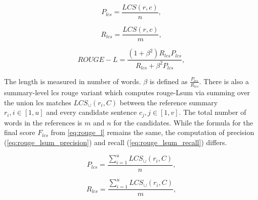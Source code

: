 \begin{equation}
P_{lcs} = \frac{LCS(r,c)}{n},
\label{eq:rouge_l_precision}
\end{equation}

\begin{equation}
R_{lcs} = \frac{LCS(r,c)}{m},
\label{eq:rouge_l_recall}
\end{equation}

\begin{equation}
ROUGE-L = \frac{(1 + \beta^2)R_{lcs}P_{lcs}}{R_{lcs} + \beta^2 P_{lcs}},
\label{eq:rouge_l}
\end{equation}

The length is measured in number of words.
$\beta$ is defined as $\frac{P_{lcs}}{R_{lcs}}$.
There is also a summary-level \ac{lcs} \ac{rouge} variant which computes \ac{rouge}-Lsum via summing over the union \ac{lcs} matches $LCS_\cup(r_i,C)$ between the reference summary $r_i, i \in [1,u]$ and every candidate sentence $c_j, j \in [1,v]$.
The total number of words in the references is $m$ and $n$ for the candidates.
While the formula for the final score $F_{lcs}$ from \autoref{eq:rouge_l} remains the same, the computation of precision (\autoref{eq:rouge_lsum_precision}) and recall (\autoref{eq:rouge_lsum_recall}) differs.

\begin{equation}
P_{lcs} = \frac{\sum_{i=1}^{u}LCS_\cup(r_i,C)}{n},
\label{eq:rouge_lsum_precision}
\end{equation}

\begin{equation}
R_{lcs} = \frac{\sum_{i=1}^{u}LCS_\cup(r_i,C)}{m},
\label{eq:rouge_lsum_recall}
\end{equation}

